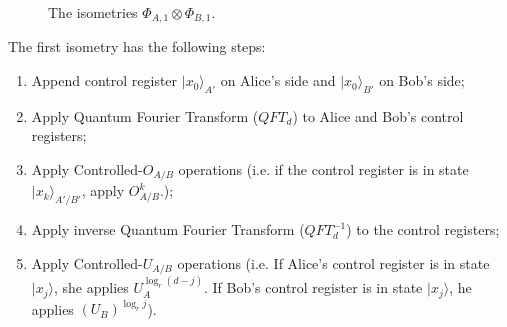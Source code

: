 \documentclass[11pt,letterpaper]{article}
\newcommand{\ket}[1]{|#1\rangle}
\newcommand{\x}{\otimes}
\newcommand{\1}{\mathbb{1}}
\theoremstyle{definition}
\begin{document}
\begin{figure}[H]
	\caption{The isometries $\Phi_{A,1} \x \Phi_{B,1}$.}
\end{figure}

The first isometry has the following steps:
\begin{enumerate}
	\item Append control register $\ket{x_0}_{A'}$ on Alice's side and $\ket{x_0}_{B'}$ on Bob's side;
	\item Apply Quantum Fourier Transform ($QFT_d$) to Alice and Bob's control registers;
	\item Apply Controlled-$O_{A/B}$ operations (i.e. if the control register is in state $\ket{x_k}_{A'/ B'}$, apply
	$O_{A/B}^k$.);
	\item Apply inverse Quantum Fourier Transform ($QFT_d^{-1}$) to the control registers;
	\item Apply Controlled-$U_{A/B}$ operations (i.e. If Alice's control register is in state $\ket{x_j}$, she applies
	$U_A^{\log_r (d-j)}$. If Bob's control register is in state $\ket{x_j}$, he applies $(U_B)^{\log_r j}$).
\end{enumerate}
\end{document}
